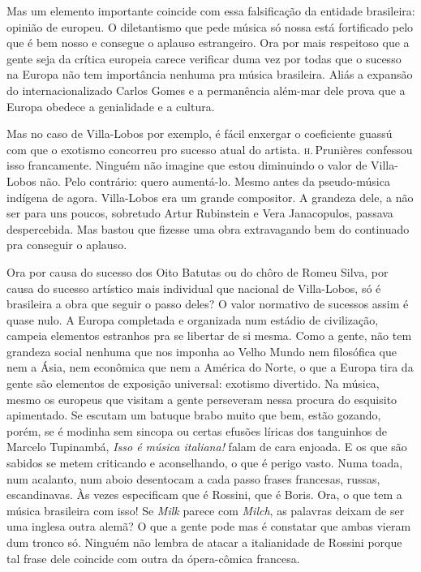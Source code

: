 Mas um elemento importante coincide com essa falsificação da entidade
brasileira: opinião de europeu. O diletantismo que pede música só nossa
está fortificado pelo que é bem nosso e consegue o aplauso
estrangeiro. Ora por mais respeitoso que a gente seja da crítica
europeia carece verificar duma vez por todas que o sucesso na Europa não
tem importância nenhuma pra música brasileira. Aliás a expansão do
internacionalizado Carlos Gomes e a permanência além-mar dele prova que
a Europa obedece a genialidade e a cultura.

Mas no caso de Villa-Lobos por exemplo, é fácil enxergar o coeficiente
guassú com que o exotismo concorreu pro sucesso atual do artista. \textsc{h}.\,Prunières confessou isso francamente. Ninguém não imagine que estou
diminuindo o valor de Villa-Lobos não. Pelo contrário: quero aumentá-lo.
Mesmo antes da pseudo-música indígena de agora. Villa-Lobos era um
grande compositor. A grandeza dele, a não ser para uns poucos, sobretudo
Artur Rubinstein e Vera Janacopulos, passava despercebida. Mas bastou
que fizesse uma obra extravagando bem do continuado pra conseguir o
aplauso.

Ora por causa do sucesso dos Oito Batutas ou do chôro de Romeu Silva,
por causa do sucesso artístico mais individual que nacional de
Villa-Lobos, só é brasileira a obra que seguir o passo deles? O valor
normativo de sucessos assim é quase nulo. A Europa completada e
organizada num estádio de civilização, campeia elementos estranhos pra
se libertar de si mesma. Como a gente, não tem grandeza social nenhuma
que nos imponha ao Velho Mundo nem filosófica que nem a Ásia, nem
econômica que nem a América do Norte, o que a Europa tira da gente são
elementos de exposição universal: exotismo divertido. Na música, mesmo
os europeus que visitam a gente perseveram nessa procura do esquisito
apimentado. Se escutam um batuque brabo muito que bem, estão gozando,
porém, se é modinha sem sincopa ou certas efusões líricas dos tanguinhos
de Marcelo Tupinambá, \emph{Isso é música italiana!} falam de cara
enjoada. E os que são sabidos se metem criticando e aconselhando, o que
é perigo vasto. Numa toada, num acalanto, num aboio desentocam a cada
passo frases francesas, russas, escandinavas. Às vezes especificam que é
Rossini, que é Boris. Ora, o que tem a música brasileira com isso!
Se \emph{Milk} parece com \emph{Milch}, as palavras deixam de ser uma
inglesa outra alemã? O que a gente pode mas é constatar que ambas vieram
dum tronco só. Ninguém não lembra de atacar a italianidade de Rossini
porque tal frase dele coincide com outra da ópera-cômica francesa.

